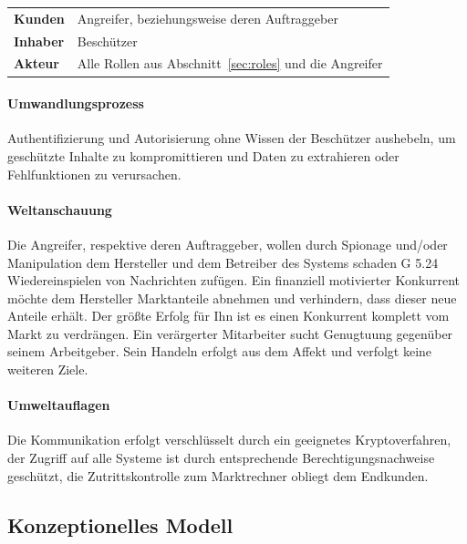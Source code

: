 \documentclass[11pt,a4paper]{report}
\begin{document}
\begin{table}[h] %
\begin{tabularx}{\linewidth}{@{}lX@{}}
\textbf{Kunden} & Angreifer, beziehungsweise deren Auftraggeber\\
\textbf{Inhaber} & Beschützer\\
\textbf{Akteur} & Alle Rollen aus Abschnitt~\ref{sec:roles} und die Angreifer\\
\end{tabularx}
\end{table}

\paragraph{Umwandlungsprozess} Authentifizierung und Autorisierung ohne Wissen der Beschützer aushebeln, um geschützte Inhalte zu kompromittieren und Daten zu extrahieren oder Fehlfunktionen zu verursachen.

\paragraph{Weltanschauung} Die Angreifer, respektive deren Auftraggeber, wollen durch Spionage und/oder Manipulation dem Hersteller und dem
Betreiber des Systems schaden G 5.24 Wiedereinspielen von Nachrichten  zufügen. Ein finanziell motivierter Konkurrent möchte dem Hersteller Marktanteile abnehmen und verhindern, dass dieser neue Anteile erhält. Der größte Erfolg für Ihn ist es einen Konkurrent komplett vom Markt zu verdrängen. Ein verärgerter Mitarbeiter sucht Genugtuung gegenüber seinem Arbeitgeber. Sein Handeln erfolgt aus dem Affekt und verfolgt keine weiteren Ziele.

\paragraph{Umweltauflagen} Die Kommunikation erfolgt verschlüsselt durch ein geeignetes Kryptoverfahren, der Zugriff auf alle Systeme ist durch entsprechende Berechtigungsnachweise geschützt, die Zutrittskontrolle zum Marktrechner obliegt dem Endkunden.

\subsection{Konzeptionelles Modell}
\end{document}
